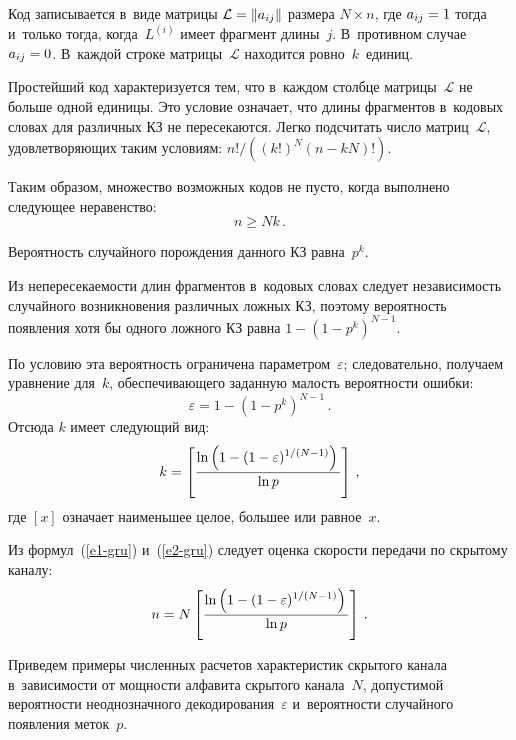 \begin{multicols}{2}
  Код записывается в~виде матрицы $\mathcal{L}\hm= \left\| a_{ij}\right\|$ 
размера $N\times n$, где $a_{ij}\hm=1$ тогда и~только тогда, когда~$L^{(i)}$ 
имеет фрагмент длины~$j$. В~противном случае $a_{ij}\hm=0$. В~каж\-дой 
строке матрицы~$\mathcal{L}$ находится ровно~$k$~единиц. 
  
  Простейший код характеризуется тем, что в~каж\-дом столбце 
матрицы~$\mathcal{L}$ не больше одной единицы. Это условие означает, что 
длины фрагментов в~кодовых словах для различных КЗ не пересекаются. Легко 
подсчитать число матриц~$\mathcal{L}$, удовлетворя\-ющих таким условиям:
${n!}/({(k!)^N(n-kN)!})$.
  
  Таким образом, множество возможных кодов не пусто, когда выполнено 
следующее неравенство:
  \begin{equation}
  n\geq Nk\,.
  \label{e1-gru}
  \end{equation}
  
  Вероятность случайного порождения данного КЗ равна~$p^k$. 
  
  Из непересекаемости длин фрагментов в~кодовых словах следует 
независимость случайного возникновения различных ложных КЗ, поэтому 
вероятность появления хотя бы одного ложного КЗ равна
  $1-(1-p^k)^{N-1}$.
  
  По условию эта вероятность ограничена па\-ра\-мет\-ром~$\varepsilon$; 
следовательно, получаем уравнение для~$k$, обеспечивающего заданную 
малость вероятности ошибки:
  $$
  \varepsilon = 1-\left( 1-p^k\right)^{N-1}\,.
  $$
  Отсюда $k$ имеет следующий вид:
  \begin{equation}
  k=\left[ \displaystyle\frac{\displaystyle \ln \left(1-(1-\varepsilon)^{1/(N-1)}\right)\mathstrut}{\displaystyle \ln p\mathstrut}\right]\,,
  \label{e2-gru}
  \end{equation}
где $[x]$ означает наименьшее целое, большее или равное~$x$. 

  Из формул~(\ref{e1-gru}) и~(\ref{e2-gru}) следует оценка скорости передачи по скрытому каналу:
  \begin{equation*}
  n= N\left[ \displaystyle\frac{\displaystyle \ln \left(1-(1-\varepsilon)^{1/(N-1)}\right)\mathstrut}{\displaystyle \ln p\mathstrut}\right]\,.
  \end{equation*}
  
  Приведем примеры численных расчетов характеристик скрытого канала 
в~зависимости от мощности алфавита скрытого канала~$N$, допустимой 
вероятности неоднозначного декодирования~$\varepsilon$ и~вероятности 
случайного появления меток~$p$.
  

 
  


\end{multicols}
